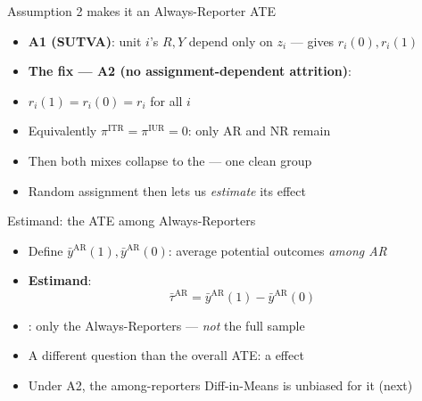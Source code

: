 \documentclass[table, xcolor = {dvipsnames}, 9pt]{beamer}
\theoremstyle{plain}
\newcommand{\mh}[1]{{\color{magenta}{#1}}}
\begin{document}
\begin{frame}[t]{Assumption 2 makes it an Always-Reporter ATE}
\vfill
\begin{itemize} \vfill
\item \textbf{A1 (SUTVA)}: unit $i$'s $R, Y$ depend only on $z_i$ --- gives $r_i(0), r_i(1)$ \vfill
\item \textbf{The fix --- A2 (no assignment-dependent attrition)}: \vfill
\item[] $r_i(1) = r_i(0) = r_i$ for all $i$ \vfill
\item[] Equivalently $\pi^{\textrm{ITR}} = \pi^{\textrm{IUR}} = 0$: only AR and NR remain \vfill
\item Then both mixes collapse to the \mh{Always-Reporters} --- one clean group \vfill
\item Random assignment then lets us \emph{estimate} its effect \vfill
\end{itemize} \vfill
\end{frame}
\begin{frame}[t]{Estimand: the ATE among Always-Reporters}
\vfill
\begin{itemize} \vfill
\item Define $\bar{y}^{\textrm{AR}}(1), \bar{y}^{\textrm{AR}}(0)$: average potential outcomes \emph{among AR} \vfill
\item \textbf{Estimand}:
\begin{equation*}
\bar{\tau}^{\textrm{AR}} = \bar{y}^{\textrm{AR}}(1) - \bar{y}^{\textrm{AR}}(0)
\end{equation*} \vfill
\item \mh{Population}: only the Always-Reporters --- \emph{not} the full sample \vfill
\item A different question than the overall ATE: a \mh{subgroup} effect \vfill
\item Under A2, the among-reporters Diff-in-Means is unbiased for it (next) \vfill
\end{itemize} \vfill
\end{frame}
\end{document}
